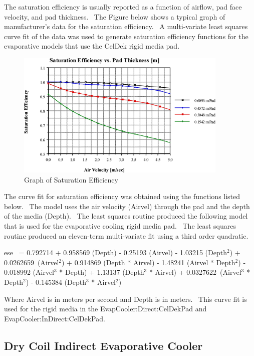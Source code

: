 The saturation efficiency is usually reported as a function of airflow, pad face velocity, and pad thickness.~ The Figure below shows a typical graph of manufacturer's data for the saturation efficiency.~ A multi-variate least squares curve fit of the data was used to generate saturation efficiency functions for the evaporative models that use the CelDek rigid media pad.

\begin{figure}[hbtp] %
\centering
\includegraphics[width=0.9\textwidth, height=0.9\textheight, keepaspectratio=true]{media/image4793.png}
\caption{Graph of Saturation Efficiency \protect \label{fig:graph-of-saturation-efficiency}}
\end{figure}

The curve fit for saturation efficiency was obtained using the functions listed below.~ The model uses the air velocity (Airvel) through the pad and the depth of the media (Depth).~ The least squares routine produced the following model that is used for the evaporative cooling rigid media pad.~ The least squares routine produced an eleven-term multi-variate fit using a third order quadratic.

ese~ = 0.792714 + 0.958569 (Depth) - 0.25193 (Airvel) - 1.03215 (Depth\(^{2}\)) + 0.0262659~(Airvel\(^{2}\)) + 0.914869 (Depth * Airvel) - 1.48241 (Airvel * Depth\(^{2}\)) - 0.018992 (Airvel\(^{3}\) * Depth) + 1.13137 (Depth\(^{3}\) * Airvel) + 0.0327622~(Airvel\(^{3}\) * Depth\(^{2}\)) - 0.145384 (Depth\(^{3}\) * Airvel\(^{2}\))

Where Airvel is in meters per second and Depth is in meters.~ This curve fit is used for the rigid media in the EvapCooler:Direct:CelDekPad and EvapCooler:InDirect:CelDekPad.

\subsection{Dry Coil Indirect Evaporative Cooler}\label{dry-coil-indirect-evaporative-cooler}

